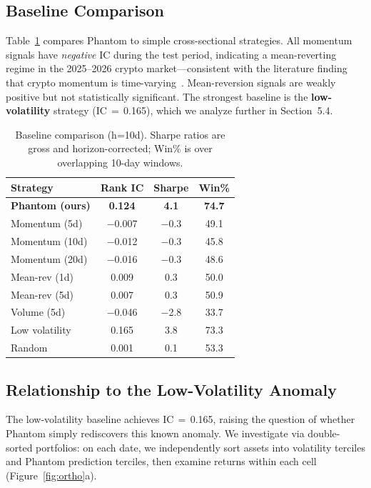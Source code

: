 \documentclass[sigconf]{acmart}
\begin{document}
\subsection{Baseline Comparison}

Table~\ref{tab:baselines} compares Phantom to simple cross-sectional strategies.
All momentum signals have \emph{negative} IC during the test period, indicating a mean-reverting regime in the 2025--2026 crypto market---consistent with the literature finding that crypto momentum is time-varying~\cite{fieberg2024}.
Mean-reversion signals are weakly positive but not statistically significant.
The strongest baseline is the \textbf{low-volatility} strategy (IC$\,{=}\,$0.165), which we analyze further in Section~5.4.

\begin{table}[h]
\small
\centering
\caption{Baseline comparison (h=10d). Sharpe ratios are gross and horizon-corrected; Win\% is over overlapping 10-day windows.}
\label{tab:baselines}
\begin{tabular}{lccc}
\toprule
Strategy & Rank IC & Sharpe & Win\% \\
\midrule
\textbf{Phantom (ours)} & \textbf{0.124} & \textbf{4.1} & \textbf{74.7} \\
Momentum (5d) & $-$0.007 & $-$0.3 & 49.1 \\
Momentum (10d) & $-$0.012 & $-$0.3 & 45.8 \\
Momentum (20d) & $-$0.016 & $-$0.3 & 48.6 \\
Mean-rev (1d) & 0.009 & 0.3 & 50.0 \\
Mean-rev (5d) & 0.007 & 0.3 & 50.9 \\
Volume (5d) & $-$0.046 & $-$2.8 & 33.7 \\
Low volatility & 0.165 & 3.8 & 73.3 \\
Random & 0.001 & 0.1 & 53.3 \\
\bottomrule
\end{tabular}
\end{table}

\subsection{Relationship to the Low-Volatility Anomaly}

The low-volatility baseline achieves IC$\,{=}\,$0.165, raising the question of whether Phantom simply rediscovers this known anomaly.
We investigate via double-sorted portfolios: on each date, we independently sort assets into volatility terciles and Phantom prediction terciles, then examine returns within each cell (Figure~\ref{fig:ortho}a).
\end{document}

